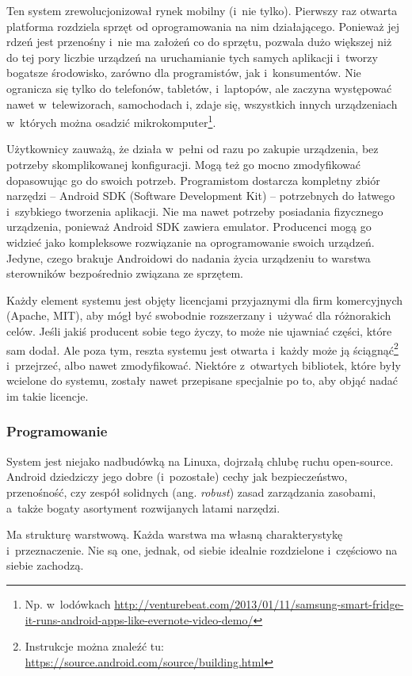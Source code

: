 Ten system zrewolucjonizował rynek mobilny (i~nie tylko). Pierwszy raz otwarta platforma rozdziela sprzęt od oprogramowania na nim działającego. Ponieważ jej rdzeń jest przenośny i~nie ma założeń co do sprzętu, pozwala dużo większej niż do tej pory liczbie urządzeń na uruchamianie tych samych aplikacji i~tworzy bogatsze środowisko, zarówno dla programistów, jak i~konsumentów. Nie ogranicza się tylko do telefonów, tabletów, i~laptopów, ale zaczyna występować nawet w~telewizorach, samochodach i, zdaje się, wszystkich innych urządzeniach w~których można osadzić mikrokomputer\footnote{Np. w~lodówkach \url{http://venturebeat.com/2013/01/11/samsung-smart-fridge-it-runs-android-apps-like-evernote-video-demo/}}.

Użytkownicy zauważą, że działa w~pełni od razu po zakupie urządzenia, bez potrzeby skomplikowanej konfiguracji. Mogą też go mocno zmodyfikować dopasowując go do swoich potrzeb.
Programistom dostarcza kompletny zbiór narzędzi -- Android SDK (Software Development Kit) -- potrzebnych do łatwego i~szybkiego tworzenia aplikacji. Nie ma nawet potrzeby posiadania fizycznego urządzenia, ponieważ Android SDK zawiera emulator.
Producenci mogą go widzieć jako kompleksowe rozwiązanie na oprogramowanie swoich urządzeń. Jedyne, czego brakuje Androidowi do nadania życia urządzeniu to warstwa sterowników bezpośrednio związana ze sprzętem.

Każdy element systemu jest objęty licencjami przyjaznymi dla firm komercyjnych (Apache, MIT), aby mógł być swobodnie rozszerzany i~używać dla różnorakich celów.
Jeśli jakiś producent sobie tego życzy, to może nie ujawniać części, które sam dodał. Ale poza tym, reszta systemu jest otwarta i~każdy może ją ściągnąć\footnote{Instrukcje można znaleźć tu: \url{https://source.android.com/source/building.html}} i~przejrzeć, albo nawet zmodyfikować.
Niektóre z~otwartych bibliotek, które były wcielone do systemu, zostały nawet przepisane specjalnie po to, aby objąć nadać im takie licencje.

\subsubsection{Programowanie}
System jest niejako nadbudówką na Linuxa, dojrzałą chlubę ruchu open-source. Android dziedziczy jego dobre (i~pozostałe) cechy jak bezpieczeństwo, przenośność, czy zespół solidnych (ang. \emph{robust}) zasad zarządzania zasobami, a~także bogaty asortyment rozwijanych latami narzędzi.

Ma strukturę warstwową. Każda warstwa ma własną charakterystykę i~przeznaczenie. Nie są one, jednak, od siebie idealnie rozdzielone i~częściowo na siebie zachodzą.

